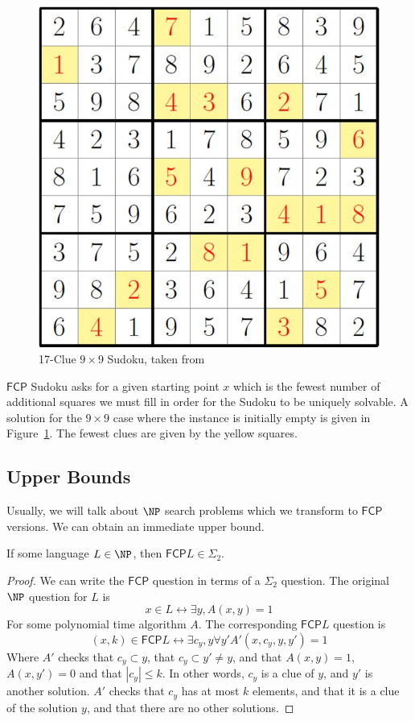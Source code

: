 \documentclass[runningheads,a4paper]{llncs}
\begin{document}
\begin{figure}
\centering
\label{fig:seventeencluesudoku}
\includegraphics[width=0.5\linewidth]{seventeencluesudoku.jpg}
\caption{17-Clue $9 \times 9$ Sudoku, taken from \cite{smallsudoku}}
\end{figure}

$\mathsf{FCP}$ Sudoku asks for a given starting point $x$ which is the fewest number of additional squares we must fill in order for the Sudoku to be uniquely solvable. A solution for the $9 \times 9$ case where the instance is initially empty is given in Figure~\ref{fig:seventeencluesudoku}. The fewest clues are given by the yellow squares.

\subsection{Upper Bounds}

Usually, we will talk about $\NP$ search problems which we transform to $\mathsf{FCP}$ versions. We can obtain an immediate upper bound.

\begin{theorem}
\label{thm:satinsig2}
If some language $L \in \NP$, then $\mathsf{FCP} L \in \Sigma_2$. 
\end{theorem}

\begin{proof}
We can write the $\mathsf{FCP}$ question in terms of a $\Sigma_2$ question. The original $\NP$ question for $L$ is
\[ x \in L \leftrightarrow \exists y, A(x, y) = 1 \]
For some polynomial time algorithm $A$. The corresponding $\mathsf{FCP} L$ question is
\[ (x, k) \in \mathsf{FCP} L \leftrightarrow \exists c_y, y \forall y' A'(x, c_y, y, y') = 1 \]
Where $A'$ checks that $c_y \subset y$, that $c_y \subset y' \neq y$, and that $A(x,y) = 1$, $A(x, y') = 0$ and that $|c_y| \leq k$. In other words, $c_y$ is a clue of $y$, and $y'$ is another solution. $A'$ checks that $c_y$ has at most $k$ elements, and that it is a clue of the solution $y$, and that there are no other solutions. 
\end{proof}
\end{document}
